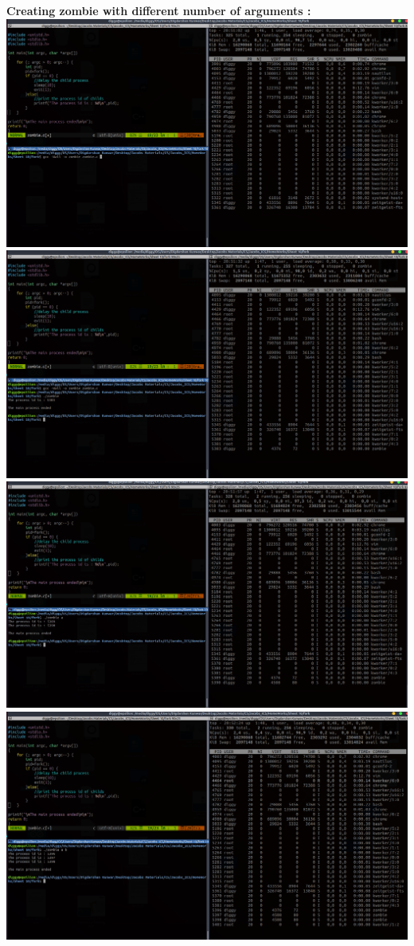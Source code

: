 \documentclass{article}
\begin{document}
\textbf{Creating zombie with different number of arguments :}\\
\includegraphics[scale=0.27]{image/1.png}\\
\includegraphics[scale=0.27]{image/2.png}\\
\includegraphics[scale=0.27]{image/3.png}\\
\includegraphics[scale=0.27]{image/4.png}\\
\end{document}
